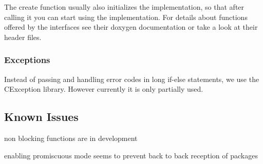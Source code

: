 The create function usually also initializes the implementation, so that after calling it you can start using the implementation. For details about functions offered by the interfaces see their doxygen documentation or take a look at their header files.

\subsubsection*{Exceptions}

Instead of passing and handling error codes in long if-\/else statements, we use the C\+Exception library. However currently it is only partially used.

\subsection*{Known Issues}


\begin{DoxyItemize}
\item non blocking functions are in development
\item enabling promiscuous mode seems to prevent back to back reception of packages 
\end{DoxyItemize}